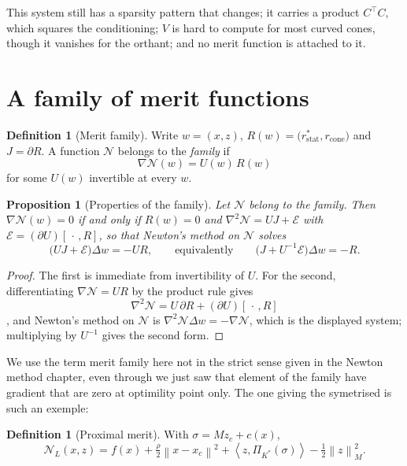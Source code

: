 \documentclass[a4paper,11pt]{book}
\theoremstyle{plain}
\newtheorem{proposition}[theorem]{Proposition}
\theoremstyle{definition}
\newtheorem{definition}[theorem]{Definition}
\theoremstyle{remark}
\numberwithin{equation}{chapter}
\numberwithin{algorithm}{chapter}
\newcommand{\proj}[2]{\Pi_{#2}\!\left(#1\right)}
\newcommand{\norm}[1]{\left\|#1\right\|}
\newcommand{\inner}[2]{\left\langle #1, #2 \right\rangle}
\begin{document}
	This system still has a sparsity pattern that changes; it carries a product
	$C^\top C$, which squares the conditioning; $V$ is hard to compute for most
	curved cones, though it vanishes for the orthant; and no merit function is
	attached to it.
	
	\section{A family of merit functions}
	
	\begin{definition}[Merit family]
		Write $w=(x,z)$, $R(w)=\bigl(r^{*}_{\mathrm{stat}},r_{\mathrm{cone}}\bigr)$ and
		$J=\partial R$. A function $\mathcal{N}$ belongs to the \emph{family} if
		\begin{equation}
			\nabla\mathcal{N}(w)=U(w)\,R(w)
		\end{equation}
		for some $U(w)$ invertible at every $w$.
	\end{definition}
	
	\begin{proposition}[Properties of the family]
		Let $\mathcal{N}$ belong to the family. Then $\nabla\mathcal{N}(w)=0$ if and only if $R(w)=0$ and
		$\nabla^2\mathcal{N}=UJ+\mathcal{E}$ with
		$\mathcal{E}=(\partial U)[\,\cdot\,,R]$, so that Newton's method on
		$\mathcal{N}$ solves
		\begin{equation}
			\bigl(UJ+\mathcal{E}\bigr)\Delta w=-UR,
			\qquad\text{equivalently}\qquad
			\bigl(J+U^{-1}\mathcal{E}\bigr)\Delta w=-R \label{eq:displaced} .
		\end{equation}
	\end{proposition}
	
	\begin{proof}
		The first is immediate from invertibility of $U$. For the second, differentiating
		$\nabla\mathcal{N}=U R$ by the product rule gives
		$$\nabla^2\mathcal{N}=U\,\partial R+(\partial U)[\,\cdot\,,R]$$, and Newton's
		method on $\mathcal{N}$ is $\nabla^2\mathcal{N}\Delta w=-\nabla\mathcal{N}$,
		which is the displayed system; multiplying by $U^{-1}$ gives the second form.
	\end{proof}
	
	We use the term merit family here not in the strict sense given in the Newton method chapter, even through we just saw that element of the family have gradient that are zero at optimility point only. The one giving the symetrised  is such an exemple:
	\begin{definition}[Proximal merit]
		With $\sigma=Mz_c+c(x)$,
		\begin{equation}
			\mathcal{N}_L(x,z)=f(x)+\tfrac{\rho}{2}\norm{x-x_c}^2
			+\inner{z}{\proj{\sigma}{K^*}}-\tfrac12\norm{z}^2_M .
		\end{equation}
	\end{definition}
	
\end{document}
